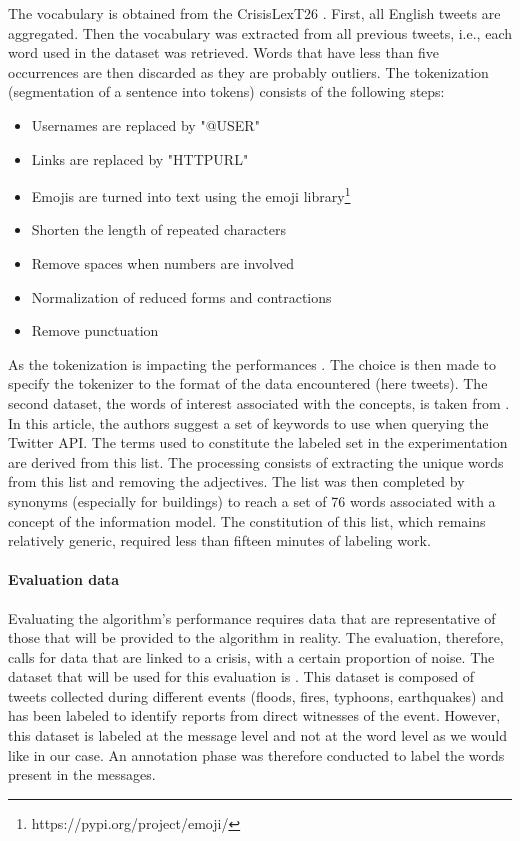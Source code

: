 The vocabulary is obtained from the CrisisLexT26 \parencite{olteanuWhatExpectWhen2015}.
First, all English tweets are aggregated.
Then the vocabulary was extracted from all previous tweets, i.e., each word used in the dataset was retrieved.
Words that have less than five occurrences are then discarded as they are probably outliers.
The tokenization (segmentation of a sentence into tokens) consists of the following steps:

\begin{itemize}
    \item Usernames are replaced by "@USER"
    \item Links are replaced by "HTTPURL"
    \item Emojis are turned into text using the emoji library\footnote{https://pypi.org/project/emoji/}
    \item Shorten the length of repeated characters
    \item Remove spaces when numbers are involved
    \item Normalization of reduced forms and contractions
    \item Remove punctuation
\end{itemize}

As the tokenization is impacting the performances \parencite[p. 21]{farzindarNaturalLanguageProcessing2017}.
The choice is then made to specify the tokenizer to the format of the data encountered (here tweets).
The second dataset, the words of interest associated with the concepts, is taken from \textcite{olteanuCrisisLexLexiconCollecting2014}.
In this article, the authors suggest a set of keywords to use when querying the Twitter API.
The terms used to constitute the labeled set in the experimentation are derived from this list.
The processing consists of extracting the unique words from this list and removing the adjectives.
The list was then completed by synonyms (especially for buildings) to reach a set of 76 words associated with a concept of the information model.
The constitution of this list, which remains relatively generic, required less than fifteen minutes of labeling work.

\paragraph{Evaluation data}
Evaluating the algorithm's performance requires data that are representative of those that will be provided to the algorithm in reality.
The evaluation, therefore, calls for data that are linked to a crisis, with a certain proportion of noise.
The dataset that will be used for this evaluation is \textcite{zahraAutomaticIdentificationEyewitness2020}.
This dataset is composed of tweets collected during different events (floods, fires, typhoons, earthquakes)
and has been labeled to identify reports from direct witnesses of the event.
However, this dataset is labeled at the message level and not at the word level as we would like in our case.
An annotation phase was therefore conducted to label the words present in the messages.

